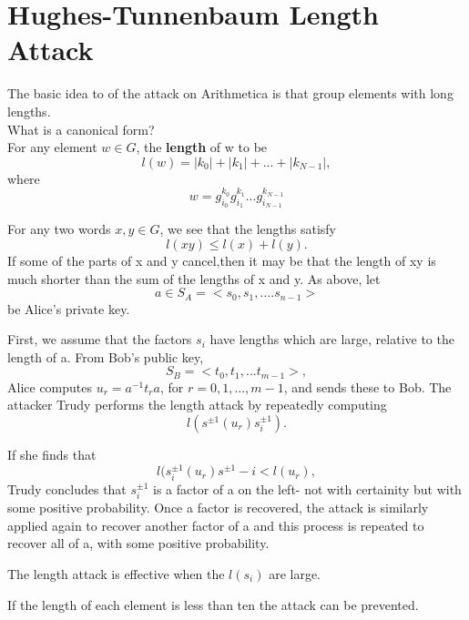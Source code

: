 \documentclass[12pt]{article}
\begin{document}
\chapter{Hughes-Tunnenbaum Length Attack}
			    \item The basic idea to of the attack on Arithmetica is that group elements with long lengths.\\
			     What is a canonical form?\\
			     For any element $w \in G$, the \textbf{length} of w to be\\
			        $$l(w)=|k_0|+|k_1|+...+|k_{N-1}|,$$
			        where $$w=g^{k_0}_{i_0}g^{k_1}_{i_1}...g^{k_{N-1}}_{i_{N-1}}$$
	     	
           For any two words $x,y \in G$, we see that the lengths satisfy\\
           $$l(xy)\leq l(x)+l(y).$$
           If some of the parts of x and y cancel,then it may be that the length of xy is much shorter than the sum of the lengths of x and y. 
            As above, let\\
           $$a \in S_A = <s_0,s_1,....s_{n-1}>$$ be Alice's private key.
           
         First, we assume that the factors $s_i$ have lengths which are large, relative to the length of a. 
         From Bob's public key,\\
          $$S_B=<t_0,t_1,...t_{m-1}>,$$
          Alice computes $u_r = a^{-1}t_ra$, for $r=0,1,...,m-1$, and sends these to Bob.
          The attacker Trudy performs the length attack by repeatedly computing\\
         $$l(s^{\pm 1}(u_r)s^{\pm 1}_i).$$
        
            If she finds that\\
           $$l(s^{\pm 1}_i(u_r)s^{\pm 1}-i < l(u_r),$$
          Trudy concludes that $s^{\pm 1}_i$ is a factor of a on the left- not with certainity but with some positive probability. 
           \vspace{3mm}
        Once a factor is recovered, the attack is similarly applied again to recover another factor of a and this process is repeated to recover all of a, with some positive probability. 
         
            The length attack is effective when the $l(s_i)$ are large. 
           \item If the length of each element is less  than ten the attack can be prevented.
        
\end{document}
